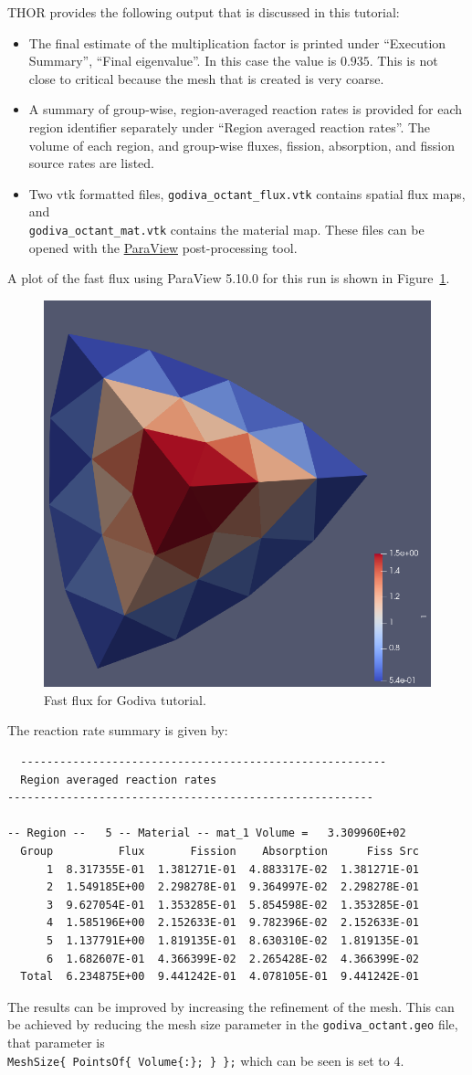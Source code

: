 \ac{THOR} provides the following output that is discussed in this tutorial:
\begin{itemize}
    \item The final estimate of the multiplication factor is printed under ``Execution Summary'', ``Final eigenvalue''.
    In this case the value is $0.935$. This is not close to critical because the mesh that
    is created is very coarse.
    \item A summary of group-wise, region-averaged reaction rates is provided for each region identifier separately under ``Region averaged reaction rates''.
    The volume of each region, and group-wise fluxes, fission, absorption, and fission source rates are listed.
    \item Two vtk formatted files, \verb"godiva_octant_flux.vtk" contains spatial flux maps, and \\
    \verb"godiva_octant_mat.vtk" contains the material map. These files can be opened with the \href{https://www.paraview.org/download/}{ParaView} post-processing tool.
\end{itemize}

A plot of the fast flux using ParaView 5.10.0 for this run is shown in Figure~\ref{fig:godiva_fast}.
\begin{figure}[th]
  \center
  \includegraphics[height=0.5\textwidth]{chapters/tutorials/figures/godiva_fast.png}
  \caption{Fast flux for Godiva tutorial.}
  \label{fig:godiva_fast}
\end{figure}

The reaction rate summary is given by:
\begin{verbatim}
  --------------------------------------------------------
  Region averaged reaction rates
--------------------------------------------------------

-- Region --   5 -- Material -- mat_1 Volume =   3.309960E+02
  Group          Flux       Fission    Absorption      Fiss Src
      1  8.317355E-01  1.381271E-01  4.883317E-02  1.381271E-01
      2  1.549185E+00  2.298278E-01  9.364997E-02  2.298278E-01
      3  9.627054E-01  1.353285E-01  5.854598E-02  1.353285E-01
      4  1.585196E+00  2.152633E-01  9.782396E-02  2.152633E-01
      5  1.137791E+00  1.819135E-01  8.630310E-02  1.819135E-01
      6  1.682607E-01  4.366399E-02  2.265428E-02  4.366399E-02
  Total  6.234875E+00  9.441242E-01  4.078105E-01  9.441242E-01
\end{verbatim}

The results can be improved by increasing the refinement of the mesh.
This can be achieved by reducing the mesh size parameter in the \verb"godiva_octant.geo" file, that parameter is \\
\verb"MeshSize{ PointsOf{ Volume{:}; } };" which can be seen is set to 4.